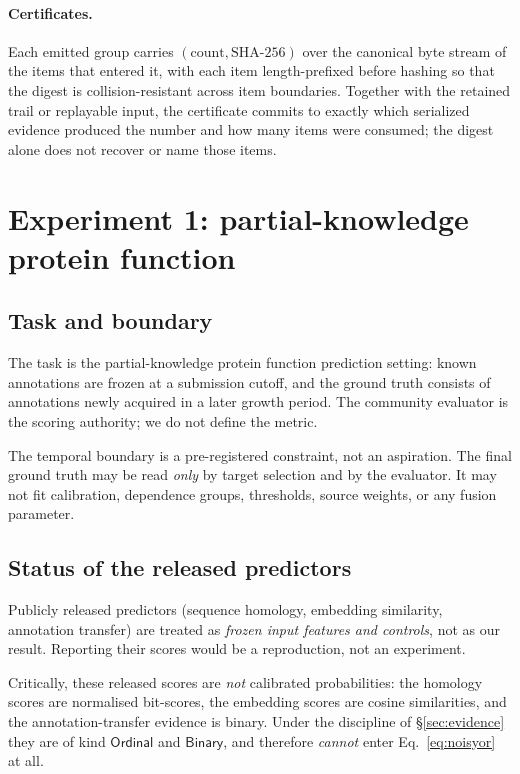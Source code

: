 \documentclass[11pt]{article}
\newcommand{\kind}[1]{\ensuremath{\mathsf{#1}}}
\begin{document}
\paragraph{Certificates.} Each emitted group carries
$(\text{count}, \text{SHA-256})$ over the canonical byte stream of the items
that entered it, with each item length-prefixed before hashing so that the
digest is collision-resistant across item boundaries. Together with the retained
trail or replayable input, the certificate commits to exactly which serialized
evidence produced the number and how many items were consumed; the digest alone
does not recover or name those items.

\section{Experiment 1: partial-knowledge protein function}\label{sec:cafa5}

\subsection{Task and boundary}

The task is the partial-knowledge protein function prediction setting: known
annotations are frozen at a submission cutoff, and the ground truth consists of
annotations newly acquired in a later growth period. The community evaluator is
the scoring authority; we do not define the metric.

The temporal boundary is a pre-registered constraint, not an aspiration. The
final ground truth may be read \emph{only} by target selection and by the
evaluator. It may not fit calibration, dependence groups, thresholds, source
weights, or any fusion parameter.

\subsection{Status of the released predictors}

Publicly released predictors (sequence homology, embedding similarity,
annotation transfer) are treated as \emph{frozen input features and controls},
not as our result. Reporting their scores would be a reproduction, not an
experiment.

Critically, these released scores are \emph{not} calibrated probabilities: the
homology scores are normalised bit-scores, the embedding scores are cosine
similarities, and the annotation-transfer evidence is binary. Under the
discipline of \S\ref{sec:evidence} they are of kind $\kind{Ordinal}$ and
$\kind{Binary}$, and therefore \emph{cannot} enter Eq.~\ref{eq:noisyor} at all.
\end{document}
